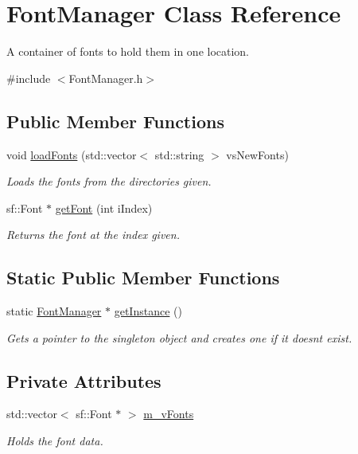 \hypertarget{class_font_manager}{}\section{Font\+Manager Class Reference}
\label{class_font_manager}


A container of fonts to hold them in one location.  




{\ttfamily \#include $<$Font\+Manager.\+h$>$}

\subsection*{Public Member Functions}
\begin{DoxyCompactItemize}
\item 
void \hyperlink{class_font_manager_a43efb3f494fecb26dd6974a5c8b3afec}{load\+Fonts} (std\+::vector$<$ std\+::string $>$ vs\+New\+Fonts)
\begin{DoxyCompactList}\small\item\em Loads the fonts from the directories given. \end{DoxyCompactList}\item 
sf\+::\+Font $\ast$ \hyperlink{class_font_manager_a3c367ce2a0b26369e29ce9af37a9cbca}{get\+Font} (int i\+Index)
\begin{DoxyCompactList}\small\item\em Returns the font at the index given. \end{DoxyCompactList}\end{DoxyCompactItemize}
\subsection*{Static Public Member Functions}
\begin{DoxyCompactItemize}
\item 
static \hyperlink{class_font_manager}{Font\+Manager} $\ast$ \hyperlink{class_font_manager_a9a9aa074f111412ed3bfd8b44281e120}{get\+Instance} ()
\begin{DoxyCompactList}\small\item\em Gets a pointer to the singleton object and creates one if it doesnt exist. \end{DoxyCompactList}\end{DoxyCompactItemize}
\subsection*{Private Attributes}
\begin{DoxyCompactItemize}
\item 
std\+::vector$<$ sf\+::\+Font $\ast$ $>$ \hyperlink{class_font_manager_ac8b4239fb72096d33801557c9f3a2845}{m\+\_\+v\+Fonts}
\begin{DoxyCompactList}\small\item\em Holds the font data. \end{DoxyCompactList}\end{DoxyCompactItemize}
